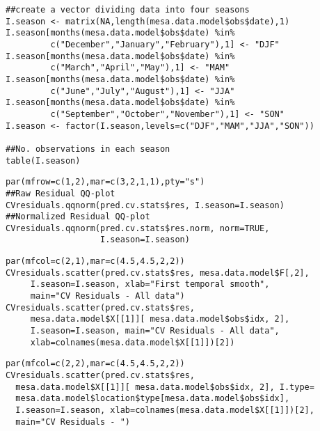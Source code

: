 \begin{verbatim}
##create a vector dividing data into four seasons
I.season <- matrix(NA,length(mesa.data.model$obs$date),1)
I.season[months(mesa.data.model$obs$date) %in%
         c("December","January","February"),1] <- "DJF"
I.season[months(mesa.data.model$obs$date) %in%
         c("March","April","May"),1] <- "MAM"
I.season[months(mesa.data.model$obs$date) %in%
         c("June","July","August"),1] <- "JJA"
I.season[months(mesa.data.model$obs$date) %in%
         c("September","October","November"),1] <- "SON"
I.season <- factor(I.season,levels=c("DJF","MAM","JJA","SON"))

##No. observations in each season
table(I.season)
\end{verbatim}
%
\vspace*{-1\baselineskip}
\begin{verbatim}
par(mfrow=c(1,2),mar=c(3,2,1,1),pty="s")
##Raw Residual QQ-plot
CVresiduals.qqnorm(pred.cv.stats$res, I.season=I.season)
##Normalized Residual QQ-plot
CVresiduals.qqnorm(pred.cv.stats$res.norm, norm=TRUE,
                   I.season=I.season)
\end{verbatim}
%
\vspace*{-1\baselineskip}
\begin{verbatim}
par(mfcol=c(2,1),mar=c(4.5,4.5,2,2))
CVresiduals.scatter(pred.cv.stats$res, mesa.data.model$F[,2],
     I.season=I.season, xlab="First temporal smooth",
     main="CV Residuals - All data")
CVresiduals.scatter(pred.cv.stats$res, 
     mesa.data.model$X[[1]][ mesa.data.model$obs$idx, 2],
     I.season=I.season, main="CV Residuals - All data",
     xlab=colnames(mesa.data.model$X[[1]])[2])
\end{verbatim}
%
\vspace*{-1\baselineskip}
\begin{verbatim}
par(mfcol=c(2,2),mar=c(4.5,4.5,2,2))
CVresiduals.scatter(pred.cv.stats$res, 
  mesa.data.model$X[[1]][ mesa.data.model$obs$idx, 2], I.type=
  mesa.data.model$location$type[mesa.data.model$obs$idx],
  I.season=I.season, xlab=colnames(mesa.data.model$X[[1]])[2], 
  main="CV Residuals - ")
\end{verbatim}
